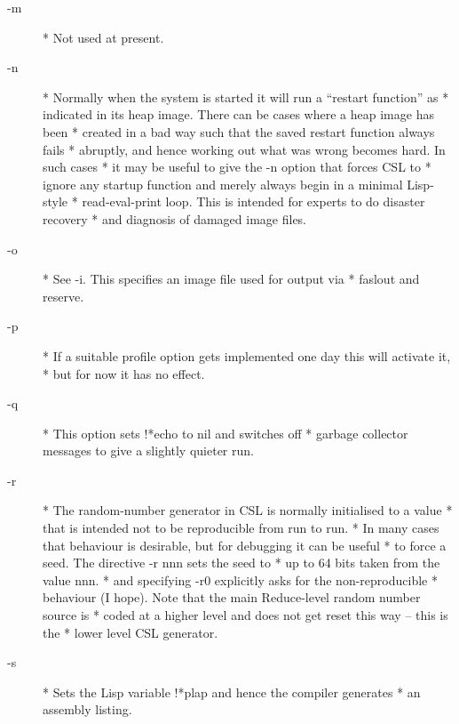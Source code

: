 \documentclass[a4paper,11pt]{article}
\begin{document}
\begin{description}
\item [{\ttfamily -m}] 
          * Not used at present.

\item [{\ttfamily -n}] 
          * Normally when the system is started it will run a ``restart function'' as
          * indicated in its heap image. There can be cases where a heap image has been
          * created in a bad way such that the saved restart function always fails
          * abruptly, and hence working out what was wrong becomes hard. In such cases
          * it may be useful to give the {\ttfamily -n} option that forces CSL to
          * ignore any startup function and merely always begin in a minimal Lisp-style
          * read-eval-print loop. This is intended for experts to do disaster recovery
          * and diagnosis of damaged image files.

\item [{\ttfamily -o}] 
          * See {\ttfamily -i}. This specifies an image file used for output via
          * {\ttfamily faslout} and {\ttfamily reserve}.

\item [{\ttfamily -p}] 
          * If a suitable profile option gets implemented one day this will activate it,
          * but for now it has no effect.

\item [{\ttfamily -q}] 
          * This option sets {\ttfamily !*echo} to {\ttfamily nil} and switches off
          * garbage collector messages to give a slightly quieter run.

\item [{\ttfamily -r}] 
          * The random-number generator in CSL is normally initialised to a value
          * that is intended not to be reproducible from run to run.
          * In many cases that behaviour is desirable, but for debugging it can be useful
          * to force a seed. The directive {\ttfamily -r nnn} sets the seed to
          * up to 64 bits taken from the value nnn.
          * and specifying {\ttfamily -r0}  explicitly asks for the non-reproducible
          * behaviour (I hope). Note that the main Reduce-level random number source is
          * coded at a higher level and does not get reset this way -- this is the
          * lower level CSL generator.

\item [{\ttfamily -s}] 
          * Sets the Lisp variable {\ttfamily !*plap} and hence the compiler generates
          * an assembly listing.


\end{description}
\end{document}
